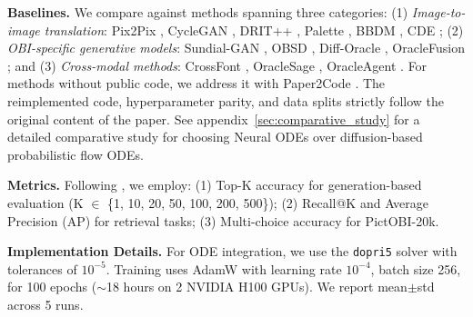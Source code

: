 \documentclass{article}
\begin{document}
\textbf{Baselines.} We compare against methods spanning three categories: (1) \textit{Image-to-image translation}: Pix2Pix \cite{isola2017image}, CycleGAN \cite{zhu2017unpaired}, DRIT++ \cite{lee2018diverse}, Palette \cite{saharia2022palette}, BBDM \cite{li2023bbdm}, CDE \cite{saharia2022image}; (2) \textit{OBI-specific generative models}: Sundial-GAN \cite{chang2022sundial}, OBSD \cite{guan2024deciphering}, Diff-Oracle \cite{li2023diff}, OracleFusion \cite{li2025oraclefusion}; and (3) \textit{Cross-modal methods}: CrossFont \cite{wu2025cross}, OracleSage \cite{jiang2024oraclesage}, OracleAgent \cite{li2025oracleagent}. For methods without public code, we address it with Paper2Code \cite{seo2025paper2code}. The reimplemented code, hyperparameter parity, and data splits strictly follow the original content of the paper. See appendix~\ref{sec:comparative_study} for a detailed comparative study for choosing Neural ODEs over diffusion-based probabilistic flow ODEs.

\textbf{Metrics.} Following \cite{wu2025cross,guan2024deciphering}, we employ: (1) Top-K accuracy for generation-based evaluation (K $\in$ \{1, 10, 20, 50, 100, 200, 500\}); (2) Recall@K and Average Precision (AP) for retrieval tasks; (3) Multi-choice accuracy for PictOBI-20k.


\textbf{Implementation Details.} 
For ODE integration, we use the \texttt{dopri5} solver with tolerances of $10^{-5}$. Training uses AdamW \cite{loshchilov2017decoupled} with learning rate $10^{-4}$, batch size 256, for 100 epochs ($\sim$18 hours on 2 NVIDIA H100 GPUs). We report mean$\pm$std across 5 runs.
\end{document}
